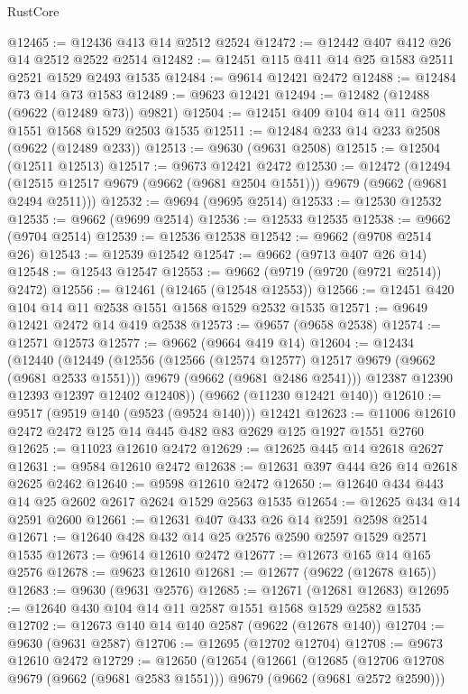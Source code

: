 \begin{lexlean}{RustCore}
\begin{coremodule}
@12465 := @12436 @413 @14 @2512 @2524
@12472 := @12442 @407 @412 @26 @14 @2512 @2522 @2514
@12482 := @12451 @115 @411 @14 @25 @1583 @2511 @2521 @1529 @2493 @1535
@12484 := @9614 @12421 @2472
@12488 := @12484 @73 @14 @73 @1583
@12489 := @9623 @12421
@12494 := @12482 (@12488 (@9622 (@12489 @73)) @9821)
@12504 := @12451 @409 @104 @14 @11 @2508 @1551 @1568 @1529 @2503 @1535
@12511 := @12484 @233 @14 @233 @2508 (@9622 (@12489 @233))
@12513 := @9630 (@9631 @2508)
@12515 := @12504 (@12511 @12513)
@12517 := @9673 @12421 @2472
@12530 := @12472
    (@12494 (@12515 @12517 @9679 (@9662 (@9681 @2504 @1551))) @9679 (@9662 (@9681 @2494 @2511)))
@12532 := @9694 (@9695 @2514)
@12533 := @12530 @12532
@12535 := @9662 (@9699 @2514)
@12536 := @12533 @12535
@12538 := @9662 (@9704 @2514)
@12539 := @12536 @12538
@12542 := @9662 (@9708 @2514 @26)
@12543 := @12539 @12542
@12547 := @9662 (@9713 @407 @26 @14)
@12548 := @12543 @12547
@12553 := @9662 (@9719 (@9720 (@9721 @2514)) @2472)
@12556 := @12461 (@12465 (@12548 @12553))
@12566 := @12451 @420 @104 @14 @11 @2538 @1551 @1568 @1529 @2532 @1535
@12571 := @9649 @12421 @2472 @14 @419 @2538
@12573 := @9657 (@9658 @2538)
@12574 := @12571 @12573
@12577 := @9662 (@9664 @419 @14)
@12604 := @12434
    (@12440
      (@12449
        (@12556
          (@12566 (@12574 @12577) @12517 @9679 (@9662 (@9681 @2533 @1551)))
          @9679
          (@9662 (@9681 @2486 @2541)))
        @12387
        @12390
        @12393
        @12397
        @12402
        @12408))
    (@9662 (@11230 @12421 @140))
@12610 := @9517 (@9519 @140 (@9523 (@9524 @140))) @12421
@12623 := @11006 @12610 @2472 @2472 @125 @14 @445 @482 @83 @2629 @125 @1927 @1551 @2760
@12625 := @11023 @12610 @2472
@12629 := @12625 @445 @14 @2618 @2627
@12631 := @9584 @12610 @2472
@12638 := @12631 @397 @444 @26 @14 @2618 @2625 @2462
@12640 := @9598 @12610 @2472
@12650 := @12640 @434 @443 @14 @25 @2602 @2617 @2624 @1529 @2563 @1535
@12654 := @12625 @434 @14 @2591 @2600
@12661 := @12631 @407 @433 @26 @14 @2591 @2598 @2514
@12671 := @12640 @428 @432 @14 @25 @2576 @2590 @2597 @1529 @2571 @1535
@12673 := @9614 @12610 @2472
@12677 := @12673 @165 @14 @165 @2576
@12678 := @9623 @12610
@12681 := @12677 (@9622 (@12678 @165))
@12683 := @9630 (@9631 @2576)
@12685 := @12671 (@12681 @12683)
@12695 := @12640 @430 @104 @14 @11 @2587 @1551 @1568 @1529 @2582 @1535
@12702 := @12673 @140 @14 @140 @2587 (@9622 (@12678 @140))
@12704 := @9630 (@9631 @2587)
@12706 := @12695 (@12702 @12704)
@12708 := @9673 @12610 @2472
@12729 := @12650
    (@12654
      (@12661
        (@12685 (@12706 @12708 @9679 (@9662 (@9681 @2583 @1551))) @9679 (@9662 (@9681 @2572 @2590)))

\end{coremodule}
\end{lexlean}
